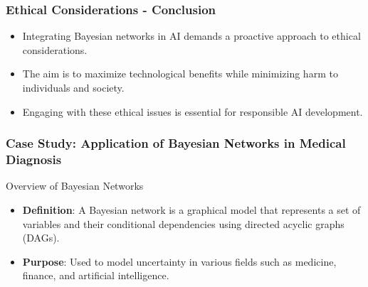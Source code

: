 \documentclass[aspectratio=169]{beamer}
\begin{document}
\begin{frame}[fragile]
    \frametitle{Ethical Considerations - Conclusion}
    \begin{itemize}
        \item Integrating Bayesian networks in AI demands a proactive approach to ethical considerations.
        \item The aim is to maximize technological benefits while minimizing harm to individuals and society.
        \item Engaging with these ethical issues is essential for responsible AI development.
    \end{itemize}
\end{frame}

\begin{frame}[fragile]
    \frametitle{Case Study: Application of Bayesian Networks in Medical Diagnosis}
    \begin{block}{Overview of Bayesian Networks}
        \begin{itemize}
            \item \textbf{Definition}: A Bayesian network is a graphical model that represents a set of variables and their conditional dependencies using directed acyclic graphs (DAGs).
            \item \textbf{Purpose}: Used to model uncertainty in various fields such as medicine, finance, and artificial intelligence.
        \end{itemize}
    \end{block}
\end{frame}
\end{document}
